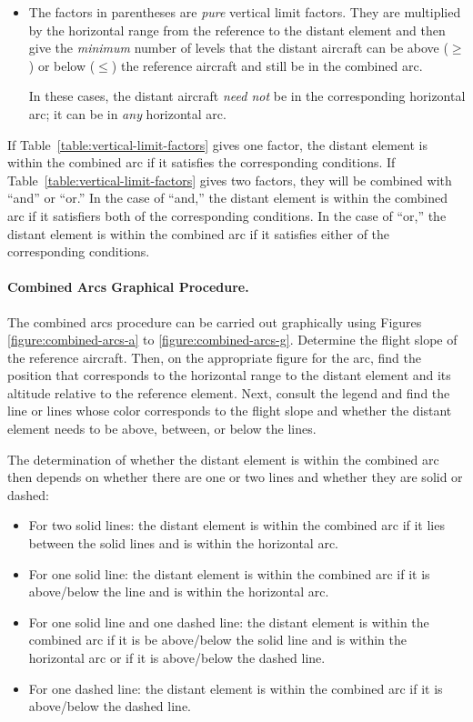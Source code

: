 {\begin{itemize}
In these cases, the distant aircraft must also be in the corresponding horizontal arc to be within the combined arc.

\item
The factors in parentheses are \emph{pure} vertical limit factors. They are multiplied by the horizontal range from the reference to the distant element and then give the \emph{minimum} number of levels that the distant aircraft can be above ($\ge$) or below ($\le$) the reference aircraft and still be in the combined arc. 

In these cases, the distant aircraft \emph{need not} be in the corresponding horizontal arc; it can be in \emph{any} horizontal arc.

\end{itemize}

If Table~\ref{table:vertical-limit-factors} gives one factor, the distant element is within the combined arc if it satisfies the corresponding conditions. If Table~\ref{table:vertical-limit-factors} gives two factors, they will be combined with “and” or “or.” In the case of “and,” the distant element is within the combined arc if it satisfiers both of the corresponding conditions. In the case of “or,” the distant element is within the combined arc if it satisfies either of the corresponding conditions.


\paragraph{Combined Arcs Graphical Procedure.}

The combined arcs procedure can be carried out graphically using Figures \ref{figure:combined-arcs-a} to \ref{figure:combined-arcs-g}. Determine the flight slope of the reference aircraft. Then, on the appropriate figure for the arc, find the position that corresponds to the horizontal range to the distant element and its altitude relative to the reference element. Next, consult the legend and find the line or lines whose color corresponds to the flight slope and whether the distant element needs to be above, between, or below the lines.

The determination of whether the distant element is within the combined arc then depends on whether there are one or two lines and whether they are solid or dashed:

\begin{itemize}
    \item For two solid lines: the distant element is within the combined arc if it lies between the solid lines and is within the horizontal arc.
    \item For one solid line: the distant element is within the combined arc if it is above/below the line and is within the horizontal arc.
    \item For one solid line and one dashed line: the distant element is within the combined arc if it is be above/below the solid line and is within the horizontal arc or if it is above/below the dashed line.
    \item For one dashed line: the distant element is within the combined arc if it is above/below the dashed line.
\end{itemize}

}
